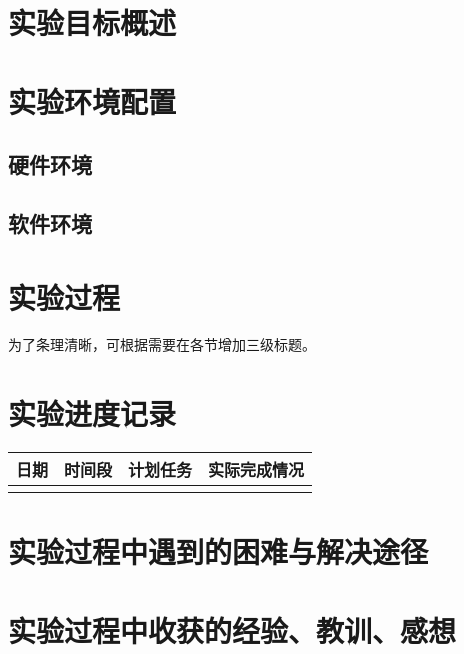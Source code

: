 \documentclass{sc}
\begin{document}
\maketitle

\tableofcontents
\newpage

\section{实验目标概述}


\section{实验环境配置}

\subsection{硬件环境}

\subsection{软件环境}


\section{实验过程}
为了条理清晰，可根据需要在各节增加三级标题。

\section{实验进度记录}

\begin{table}[H]
    \centering
    \begin{tabular}{cccc}
        \hline 
        日期 & 时间段 & 计划任务 & 实际完成情况 \\ 
        \hline 
             &        &           &                \\ 
        \hline 
    \end{tabular} 
\end{table}


\section{实验过程中遇到的困难与解决途径}

\section{实验过程中收获的经验、教训、感想}

%
\end{document}
